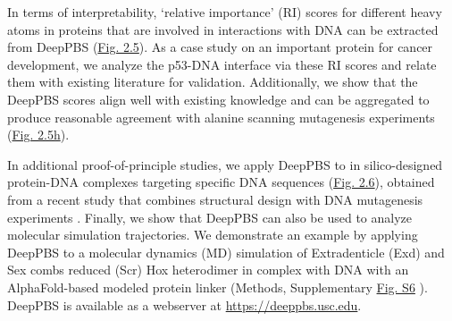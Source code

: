 \par
In terms of interpretability, ‘relative importance’ (RI) scores for different heavy atoms in proteins that are involved in interactions with DNA can be extracted from DeepPBS (\hyperref[fig:pdna4]{Fig. 2.5}). As a case study on an important protein for cancer development, we analyze the p53-DNA interface via these RI scores and relate them with existing literature for validation. Additionally, we show that the DeepPBS scores align well with existing knowledge and can be aggregated to produce reasonable agreement with alanine scanning mutagenesis experiments \citep{Morrison2001} (\hyperref[fig:pdna4]{Fig. 2.5h}).
\par
In additional proof-of-principle studies, we apply DeepPBS to in silico-designed protein-DNA complexes targeting specific DNA sequences (\hyperref[fig:pdna5]{Fig. 2.6}), obtained from a recent study that combines structural design with DNA mutagenesis experiments \citep{Glasscock2023}. Finally, we show that DeepPBS can also be used to analyze molecular simulation trajectories. We demonstrate an example by applying DeepPBS to a molecular dynamics (MD) simulation of Extradenticle (Exd) and Sex combs reduced (Scr) Hox heterodimer in complex with DNA \citep{Joshi2007} with an AlphaFold-based modeled protein linker (Methods, Supplementary \hyperref[fig:pdnaS5]{Fig. S6} ). DeepPBS is available as a webserver at \url{https://deeppbs.usc.edu}.
\par

